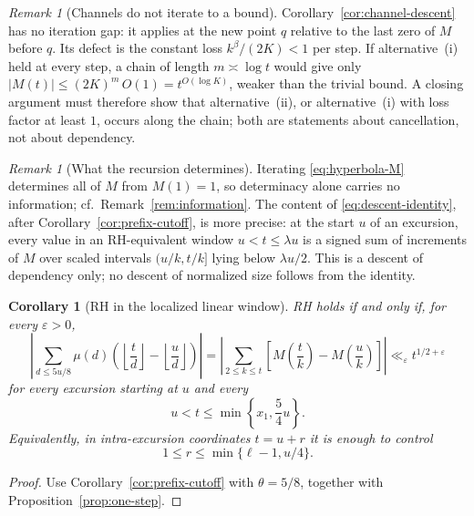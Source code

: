 \documentclass[11pt]{amsart}
\numberwithin{equation}{section}
\theoremstyle{plain}
\newtheorem{corollary}[theorem]{Corollary}
\theoremstyle{definition}
\theoremstyle{remark}
\newtheorem{remark}[theorem]{Remark}
\newcommand{\eps}{\varepsilon}
\begin{document}
\begin{remark}[Channels do not iterate to a bound]
\label{rem:channel-loss}
Corollary~\ref{cor:channel-descent} has no iteration gap: it applies at
the new point $q$ relative to the last zero of $M$ before $q$. Its defect
is the constant loss $k^\beta/(2K)<1$ per step. If alternative~(i) held at
every step, a chain of length $m\asymp\log t$ would give only
$|M(t)|\le(2K)^m\,O(1)=t^{O(\log K)}$, weaker than the trivial bound.
A closing argument must therefore show that alternative~(ii), or
alternative~(i) with loss factor at least $1$, occurs along the chain; both
are statements about cancellation, not about dependency.
\end{remark}


\begin{remark}[What the recursion determines]
\label{rem:recursion-content}
Iterating \eqref{eq:hyperbola-M} determines all of $M$ from $M(1)=1$, so
determinacy alone carries no information; cf.\
Remark~\ref{rem:information}.  The content of
\eqref{eq:descent-identity}, after Corollary~\ref{cor:prefix-cutoff}, is
more precise: at the start $u$ of an excursion, every value in an
RH-equivalent window $u<t\le\lambda u$ is a signed sum of increments of
$M$ over scaled intervals $(u/k,t/k]$ lying below $\lambda u/2$.  This is a
descent of dependency only; no descent of normalized size follows from the
identity.
\end{remark}

\begin{corollary}[RH in the localized linear window]
\label{cor:linear-window-RH}
RH holds if and only if, for every $\eps>0$,
\[
\left|\sum_{d\le5u/8}\mu(d)\left(\left\lfloor\frac td\right\rfloor
-\left\lfloor\frac ud\right\rfloor\right)\right|
=\left|\sum_{2\le k\le t}\left[M\left(\frac tk\right)-M\left(\frac uk\right)\right]\right|
\ll_\eps t^{1/2+\eps}
\]
for every excursion starting at $u$ and every
\[
u<t\le\min\left\{x_1,\frac54u\right\}.
\]
Equivalently, in intra-excursion coordinates $t=u+r$ it is enough to
control
\[
1\le r\le\min\{\ell-1,u/4\}.
\]
\end{corollary}

\begin{proof}
Use Corollary~\ref{cor:prefix-cutoff} with $\theta=5/8$, together with
Proposition~\ref{prop:one-step}.
\end{proof}
\end{document}

